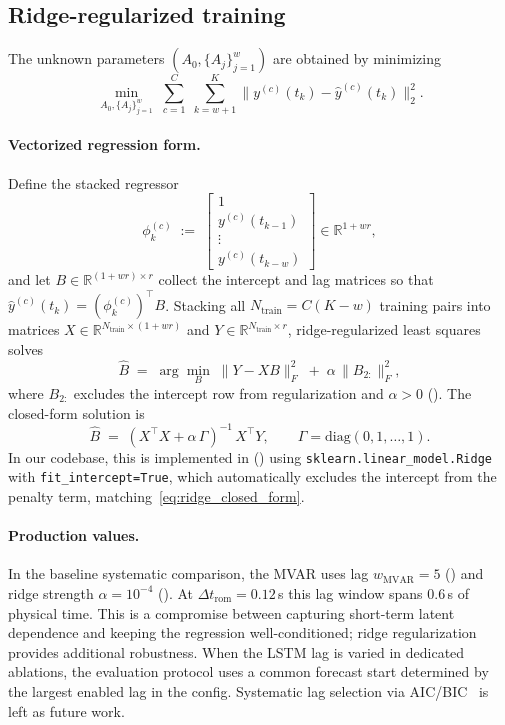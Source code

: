 \documentclass{report}
\theoremstyle{plain}
\theoremstyle{remark}
\numberwithin{equation}{section}              %
\begin{document}
\subsection{Ridge-regularized training}\label{subsec:mvar_training}
The unknown parameters $(A_0,\{A_j\}_{j=1}^w)$ are obtained by minimizing
\begin{equation}\label{eq:mvar_ls_problem}
  \min_{A_0,\{A_j\}_{j=1}^w}\;
  \sum_{c=1}^{C}\;\sum_{k=w+1}^{K}
  \bigl\|y^{(c)}(t_k)-\hat y^{(c)}(t_k)\bigr\|_2^2.
\end{equation}

\paragraph{Vectorized regression form.}
Define the stacked regressor
\[
  \phi^{(c)}_k \;:=\;
  \begin{bmatrix}1\\[2pt] y^{(c)}(t_{k-1})\\ \vdots\\ y^{(c)}(t_{k-w})\end{bmatrix}
  \!\in\mathbb{R}^{1+wr},
\]
and let
$B\in\mathbb{R}^{(1+wr)\times r}$ collect the intercept and lag matrices
so that $\hat y^{(c)}(t_k) = (\phi^{(c)}_k)^\top B$.
Stacking all $N_{\mathrm{train}}=C(K-w)$ training pairs into matrices
$X\in\mathbb{R}^{N_{\mathrm{train}}\times(1+wr)}$ and
$Y\in\mathbb{R}^{N_{\mathrm{train}}\times r}$,
ridge-regularized least squares solves
\begin{equation}\label{eq:mvar_ridge}
  \hat B \;=\; \arg\min_{B}\;\|Y - XB\|_F^2
             \;+\;\alpha\,\|B_{2:}\|_F^2,
\end{equation}
where $B_{2:}$ excludes the intercept row from regularization and
$\alpha>0$ ().
The closed-form solution is
\begin{equation}\label{eq:ridge_closed_form}
  \hat B \;=\; (X^\top X + \alpha\,\Gamma)^{-1}\,X^\top Y,
  \qquad
  \Gamma = \mathrm{diag}(0,1,\dots,1).
\end{equation}
In our codebase, this is implemented in
 \mbox{()}
using \texttt{sklearn.linear\_model.Ridge} with
\texttt{fit\_intercept=True}, which automatically excludes the intercept
from the penalty term, matching~\eqref{eq:ridge_closed_form}.

\paragraph{Production values.}
In the baseline systematic comparison, the MVAR uses lag
$w_{\mathrm{MVAR}}=5$ () and ridge strength
$\alpha=10^{-4}$ ().  At
$\Delta t_{\mathrm{rom}}=0.12$\,s this lag window spans $0.6$\,s of
physical time.  This is a compromise between capturing short-term latent
dependence and keeping the regression well-conditioned; ridge
regularization provides additional robustness.  When the LSTM lag is
varied in dedicated ablations, the evaluation protocol uses a common
forecast start determined by the largest enabled lag in the config.
Systematic lag selection via AIC/BIC~\cite{alvarez2025eqfree} is left as
future work.
\end{document}
